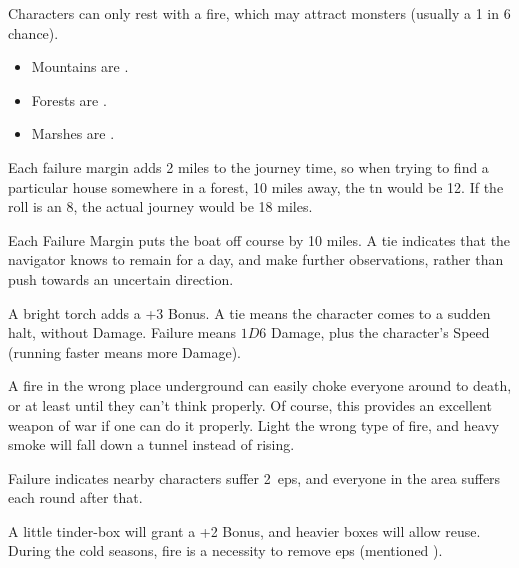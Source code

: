 \begin{multicols}{2}
Characters can only rest with a fire, which may attract monsters (usually a 1 in 6 chance).


\begin{itemize}
  \item
    Mountains are \tn[8].
  \item
    Forests are \tn[11].
  \item
    Marshes are \tn[12].
\end{itemize}

\noindent
Each failure margin adds 2 miles to the journey time, so when trying to find a particular house somewhere in a forest, 10 miles away, the \gls{tn} would be 12.
If the roll is an 8, the actual journey would be 18 miles.

Each Failure Margin puts the boat off course by 10 miles.
A tie indicates that the navigator knows to remain for a day, and make further observations, rather than push towards an uncertain direction.

%
A bright torch adds a +3 Bonus.
A tie means the character comes to a sudden halt, without Damage.
Failure means $1D6$ Damage, plus the character's Speed (running faster means more Damage).

A fire in the wrong place underground can easily choke everyone around to death, or at least until they can't think properly.
Of course, this provides an excellent weapon of war if one can do it properly.
Light the wrong type of fire, and heavy smoke will fall down a tunnel instead of rising.

Failure indicates nearby characters suffer 2~\glspl{ep}, and everyone in the area suffers  each round after that.

A little tinder-box will grant a +2 Bonus, and heavier boxes will allow reuse.
During the cold seasons, fire is a necessity to remove \glspl{ep} (mentioned ).


\end{multicols}
